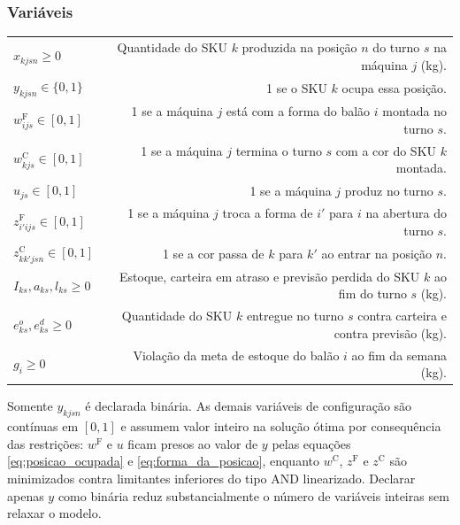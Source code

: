 \documentclass[fleqn,12pt,a4paper]{article}
\begin{document}
\subsubsection*{Variáveis}
\begin{tabularx}{\linewidth}{@{}L{2.8cm}R@{}}
$x_{kjsn} \ge 0$ & Quantidade do SKU $k$ produzida na posição $n$ do turno $s$ na máquina $j$ (kg).\\
$y_{kjsn} \in \{0,1\}$ & 1 se o SKU $k$ ocupa essa posição.\\
$w^{\mathrm{F}}_{ijs} \in [0,1]$ & 1 se a máquina $j$ está com a forma do balão $i$ montada no turno $s$.\\
$w^{\mathrm{C}}_{kjs} \in [0,1]$ & 1 se a máquina $j$ termina o turno $s$ com a cor do SKU $k$ montada.\\
$u_{js} \in [0,1]$ & 1 se a máquina $j$ produz no turno $s$.\\
$z^{\mathrm{F}}_{i'ijs} \in [0,1]$ & 1 se a máquina $j$ troca a forma de $i'$ para $i$ na abertura do turno $s$.\\
$z^{\mathrm{C}}_{kk'jsn} \in [0,1]$ & 1 se a cor passa de $k$ para $k'$ ao entrar na posição $n$.\\
$I_{ks}, a_{ks}, l_{ks} \ge 0$ & Estoque, carteira em atraso e previsão perdida do SKU $k$ ao fim do turno $s$ (kg).\\
$e^{o}_{ks}, e^{d}_{ks} \ge 0$ & Quantidade do SKU $k$ entregue no turno $s$ contra carteira e contra previsão (kg).\\
$g_{i} \ge 0$ & Violação da meta de estoque do balão $i$ ao fim da semana (kg).\\
\end{tabularx}

Somente $y_{kjsn}$ é declarada binária. As demais variáveis de configuração são contínuas em $[0,1]$ e assumem valor inteiro na solução ótima por consequência das restrições: $w^{\mathrm{F}}$ e $u$ ficam presos ao valor de $y$ pelas equações \eqref{eq:posicao_ocupada} e \eqref{eq:forma_da_posicao}, enquanto $w^{\mathrm{C}}$, $z^{\mathrm{F}}$ e $z^{\mathrm{C}}$ são minimizados contra limitantes inferiores do tipo $\text{AND}$ linearizado. Declarar apenas $y$ como binária reduz substancialmente o número de variáveis inteiras sem relaxar o modelo.
\end{document}
